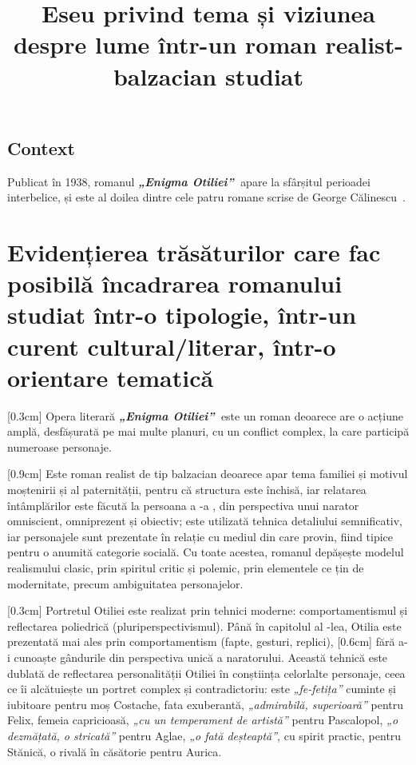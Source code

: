\documentclass[
12pt,
a4paper
]{article}
\title{Eseu privind tema și viziunea despre lume într-un roman realist-balzacian studiat}
\date{}   %
\author{} %
\newcommand{\rom}[1]{\uppercase\expandafter{\romannumeral #1\relax}} %
\newcommand{\operatitle}{\textbf{\textit{„Enigma Otiliei”\ }}} %
\newcommand{\operaauthor}{George Călinescu\ } %
\begin{document}
\maketitle %



\subsection{Context}

Publicat în 1938, romanul \operatitle apare la sfârșitul perioadei interbelice, și este al doilea dintre cele patru romane scrise de \operaauthor.

\section{Evidențierea trăsăturilor care fac posibilă încadrarea romanului studiat într-o tipologie, într-un curent cultural/literar, într-o orientare tematică}

[0.3cm]
Opera literară \operatitle este un roman deoarece are o acțiune amplă, desfășurată pe mai multe planuri, cu un conflict complex, la care participă numeroase personaje.

[0.9cm]
Este roman realist de tip balzacian deoarece apar tema familiei și motivul moștenirii și al paternității, pentru că structura este închisă, iar relatarea întâmplărilor este făcută la persoana a \rom{3}-a , din perspectiva unui narator omniscient, omniprezent și obiectiv; este utilizată tehnica detaliului semnificativ, iar personajele sunt prezentate în relație cu mediul din care provin, fiind tipice pentru o anumită categorie socială. Cu toate acestea, romanul depășește modelul realismului clasic, prin spiritul critic și polemic, prin elementele ce țin de modernitate, precum ambiguitatea personajelor.

[0.3cm]
Portretul Otiliei este realizat prin tehnici moderne: comportamentismul și reflectarea poliedrică (pluriperspectivismul). Până în capitolul al \rom{16}-lea, Otilia este prezentată mai ales prin comportamentism (fapte, gesturi, replici),
[0.6cm]
fără a-i cunoaște gândurile din perspectiva unică a naratorului. Această tehnică este dublată de reflectarea personalității Otiliei în conștiința celorlalte personaje, ceea ce îi alcătuiește un portret complex și contradictoriu: este \textit{„fe-fetița”} cuminte și iubitoare pentru moș Costache, fata exuberantă, \textit{„admirabilă, superioară”} pentru Felix, femeia capricioasă, \textit{„cu un temperament de artistă”} pentru Pascalopol, \textit{„o dezmățată, o stricată”} pentru Aglae, \textit{„o fată deșteaptă”}, cu spirit practic, pentru Stănică, o rivală în căsătorie pentru Aurica.
\end{document}
